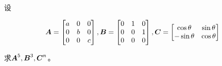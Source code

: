 \begin{problem}
设

\begin{equation*}
    \boldsymbol{A}=\begin{bmatrix}a&0&0\\0&b&0\\0&0&c\end{bmatrix},
    \boldsymbol{B}=\begin{bmatrix}0&1&0\\0&0&1\\0&0&0\end{bmatrix},
    \boldsymbol{C}=\begin{bmatrix}\cos \theta&\sin \theta\\-\sin \theta&\cos \theta\end{bmatrix}
\end{equation*}

求\(\boldsymbol{A}^5,\boldsymbol{B}^3,\boldsymbol{C}^n\)。
\end{problem}
